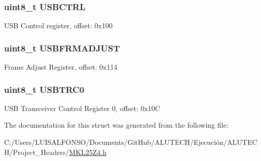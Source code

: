 \subsubsection[{U\+S\+B\+C\+T\+R\+L}]{\setlength{\rightskip}{0pt plus 5cm}uint8\+\_\+t U\+S\+B\+C\+T\+R\+L}\label{struct_u_s_b___mem_map_ad8f50417f356298d1ee6237db0aadbbc}
U\+S\+B Control register, offset\+: 0x100 \hypertarget{struct_u_s_b___mem_map_aa4fe940e858c95bfc35a6a30038e2119}{}
\subsubsection[{U\+S\+B\+F\+R\+M\+A\+D\+J\+U\+S\+T}]{\setlength{\rightskip}{0pt plus 5cm}uint8\+\_\+t U\+S\+B\+F\+R\+M\+A\+D\+J\+U\+S\+T}\label{struct_u_s_b___mem_map_aa4fe940e858c95bfc35a6a30038e2119}
Frame Adjust Register, offset\+: 0x114 \hypertarget{struct_u_s_b___mem_map_a92ef0513e19b2f5c6f57277430fdfc05}{}
\subsubsection[{U\+S\+B\+T\+R\+C0}]{\setlength{\rightskip}{0pt plus 5cm}uint8\+\_\+t U\+S\+B\+T\+R\+C0}\label{struct_u_s_b___mem_map_a92ef0513e19b2f5c6f57277430fdfc05}
U\+S\+B Transceiver Control Register 0, offset\+: 0x10\+C 

The documentation for this struct was generated from the following file\+:\begin{DoxyCompactItemize}
\item 
C\+:/\+Users/\+L\+U\+I\+S\+A\+L\+F\+O\+N\+S\+O/\+Documents/\+Git\+Hub/\+A\+L\+U\+T\+E\+C\+H/\+Ejecución/\+A\+L\+U\+T\+E\+C\+H/\+Project\+\_\+\+Headers/\hyperlink{_m_k_l25_z4_8h}{M\+K\+L25\+Z4.\+h}\end{DoxyCompactItemize}
